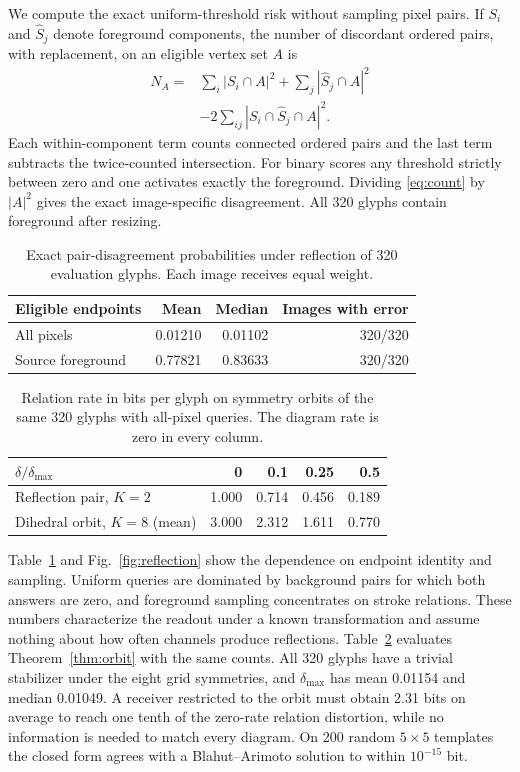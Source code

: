 \documentclass[10pt,conference]{IEEEtran}
\begin{document}
We compute the exact uniform-threshold risk without sampling pixel pairs. If $S_i$ and $\hat S_j$ denote foreground components, the number of discordant ordered pairs, with replacement, on an eligible vertex set $A$ is
\begin{align}
 N_A={}&\sum_i |S_i\cap A|^2+\sum_j|\hat S_j\cap A|^2\nonumber\\
 &-2\sum_{ij}|S_i\cap\hat S_j\cap A|^2 .
 \label{eq:count}
\end{align}
Each within-component term counts connected ordered pairs and the last term subtracts the twice-counted intersection. For binary scores any threshold strictly between zero and one activates exactly the foreground. Dividing \eqref{eq:count} by $|A|^2$ gives the exact image-specific disagreement. All 320 glyphs contain foreground after resizing.
\begin{table}[t]\centering
\caption{Exact pair-disagreement probabilities under reflection of 320 evaluation glyphs. Each image receives equal weight.}\label{tab:reflection}
\begin{tabular}{lrrr}\toprule
Eligible endpoints & Mean & Median & Images with error\\\midrule
All pixels & 0.01210 & 0.01102 & 320/320\\
Source foreground & 0.77821 & 0.83633 & 320/320\\\bottomrule
\end{tabular}\end{table}
\begin{table}[t]\centering
\caption{Relation rate in bits per glyph on symmetry orbits of the same 320 glyphs with all-pixel queries. The diagram rate is zero in every column.}\label{tab:orbit}
\begin{tabular}{lrrrr}\toprule
$\delta/\delta_{\max}$ & 0 & 0.1 & 0.25 & 0.5\\\midrule
Reflection pair, $K=2$ & 1.000 & 0.714 & 0.456 & 0.189\\
Dihedral orbit, $K=8$ (mean) & 3.000 & 2.312 & 1.611 & 0.770\\\bottomrule
\end{tabular}\end{table}
Table~\ref{tab:reflection} and Fig.~\ref{fig:reflection} show the dependence on endpoint identity and sampling. Uniform queries are dominated by background pairs for which both answers are zero, and foreground sampling concentrates on stroke relations. These numbers characterize the readout under a known transformation and assume nothing about how often channels produce reflections. Table~\ref{tab:orbit} evaluates Theorem~\ref{thm:orbit} with the same counts. All 320 glyphs have a trivial stabilizer under the eight grid symmetries, and $\delta_{\max}$ has mean 0.01154 and median 0.01049. A receiver restricted to the orbit must obtain 2.31 bits on average to reach one tenth of the zero-rate relation distortion, while no information is needed to match every diagram. On 200 random $5\times5$ templates the closed form agrees with a Blahut--Arimoto solution to within $10^{-15}$ bit.
\end{document}

